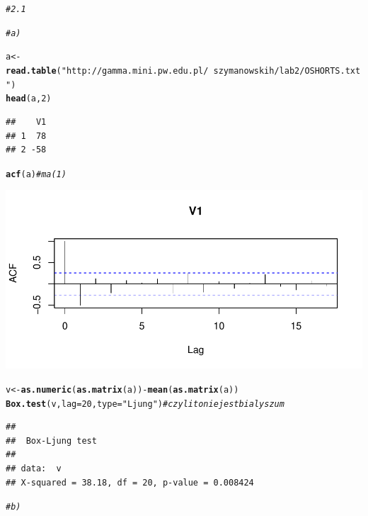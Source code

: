 \documentclass[10pt,a4paper,noindentfirst]{article}\usepackage[]{graphicx}\usepackage[]{color}
\makeatletter
\def\maxwidth{ %
  \ifdim\Gin@nat@width>\linewidth
    \linewidth
  \else
    \Gin@nat@width
  \fi
}
\newcommand{\hlnum}[1]{\textcolor[rgb]{0.686,0.059,0.569}{#1}}%
\newcommand{\hlstr}[1]{\textcolor[rgb]{0.192,0.494,0.8}{#1}}%
\newcommand{\hlcom}[1]{\textcolor[rgb]{0.678,0.584,0.686}{\textit{#1}}}%
\newcommand{\hlopt}[1]{\textcolor[rgb]{0,0,0}{#1}}%
\newcommand{\hlstd}[1]{\textcolor[rgb]{0.345,0.345,0.345}{#1}}%
\newcommand{\hlkwb}[1]{\textcolor[rgb]{0.69,0.353,0.396}{#1}}%
\newcommand{\hlkwc}[1]{\textcolor[rgb]{0.333,0.667,0.333}{#1}}%
\newcommand{\hlkwd}[1]{\textcolor[rgb]{0.737,0.353,0.396}{\textbf{#1}}}%
\newenvironment{kframe}{%
 \def\at@end@of@kframe{}%
 \ifinner\ifhmode%
  \def\at@end@of@kframe{\end{minipage}}%
  \begin{minipage}{\columnwidth}%
 \fi\fi%
 \def\FrameCommand##1{\hskip\@totalleftmargin \hskip-\fboxsep
 \colorbox{shadecolor}{##1}\hskip-\fboxsep
     \hskip-\linewidth \hskip-\@totalleftmargin \hskip\columnwidth}%
 \MakeFramed {\advance\hsize-\width
   \@totalleftmargin\z@ \linewidth\hsize
   \@setminipage}}%
 {\par\unskip\endMakeFramed%
 \at@end@of@kframe}
\newenvironment{knitrout}{}{} %
\makeatother
\begin{document}
\begin{knitrout}
\color{fgcolor}\begin{kframe}
\begin{alltt}
\hlcom{# 2.1}

\hlcom{# a)}

\hlstd{a} \hlkwb{<-} \hlkwd{read.table}\hlstd{(}\hlstr{"http://gamma.mini.pw.edu.pl/~szymanowskih/lab2/OSHORTS.txt"}\hlstd{)}
\hlkwd{head}\hlstd{(a,}\hlnum{2}\hlstd{)}
\end{alltt}
\begin{verbatim}
##    V1
## 1  78
## 2 -58
\end{verbatim}
\begin{alltt}
\hlkwd{acf}\hlstd{(a)}   \hlcom{# ma(1)}
\end{alltt}
\end{kframe}

{\centering \includegraphics[width=\maxwidth]{figure/unnamed-chunk-11} 

}


\begin{kframe}\begin{alltt}
\hlstd{v} \hlkwb{<-} \hlkwd{as.numeric}\hlstd{(}\hlkwd{as.matrix}\hlstd{(a))}\hlopt{-}\hlkwd{mean}\hlstd{(}\hlkwd{as.matrix}\hlstd{(a))}
\hlkwd{Box.test}\hlstd{(v,}\hlkwc{lag}\hlstd{=}\hlnum{20}\hlstd{,}\hlkwc{type}\hlstd{=}\hlstr{"Ljung"}\hlstd{)}   \hlcom{# czyli to nie jest bialy szum}
\end{alltt}
\begin{verbatim}
## 
## 	Box-Ljung test
## 
## data:  v
## X-squared = 38.18, df = 20, p-value = 0.008424
\end{verbatim}
\begin{alltt}
\hlcom{# b)}


\end{alltt}
\end{kframe}
\end{knitrout}
\end{document}
